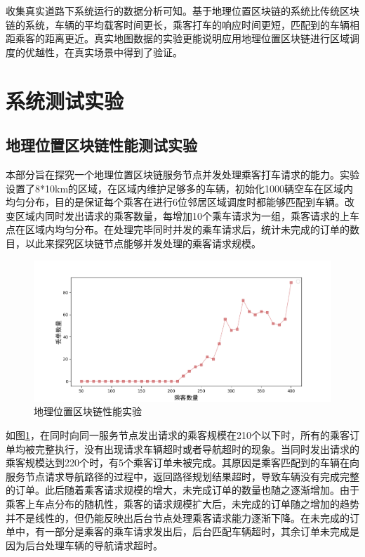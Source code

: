 收集真实道路下系统运行的数据分析可知。基于地理位置区块链的系统比传统区块链的系统，车辆的平均载客时间更长，乘客打车的响应时间更短，匹配到的车辆相距乘客的距离更近。真实地图数据的实验更能说明应用地理位置区块链进行区域调度的优越性，在真实场景中得到了验证。

\section{系统测试实验}
\subsection{地理位置区块链性能测试实验}
本部分旨在探究一个地理位置区块链服务节点并发处理乘客打车请求的能力。实验设置了8*10km的区域，在区域内维护足够多的车辆，初始化1000辆空车在区域内均匀分布，目的是保证每个乘客在进行6位邻居区域调度时都能够匹配到车辆。改变区域内同时发出请求的乘客数量，每增加10个乘车请求为一组，乘客请求的上车点在区域内均匀分布。在处理完毕同时并发的乘车请求后，统计未完成的订单的数目，以此来探究区块链节点能够并发处理的乘客请求规模。

\begin{figure}[h]
  \centering
  \includegraphics[width=1.0\textwidth]{figures/地理位置区块链性能实验}
  \caption{地理位置区块链性能实验}\label{fig:treeBlockchcainPerformance}
\end{figure}

如图\ref{fig:treeBlockchcainPerformance}，在同时向同一服务节点发出请求的乘客规模在210个以下时，所有的乘客订单均被完整执行，没有出现请求车辆超时或者导航超时的现象。当同时发出请求的乘客规模达到220个时，有5个乘客订单未被完成。其原因是乘客匹配到的车辆在向服务节点请求导航路径的过程中，返回路径规划结果超时，导致车辆没有完成完整的订单。此后随着乘客请求规模的增大，未完成订单的数量也随之逐渐增加。由于乘客上车点分布的随机性，乘客的请求规模扩大后，未完成的订单随之增加的趋势并不是线性的，但仍能反映出后台节点处理乘客请求能力逐渐下降。在未完成的订单中，有一部分是乘客的乘车请求发出后，后台匹配车辆超时，其余订单未完成是因为后台处理车辆的导航请求超时。

